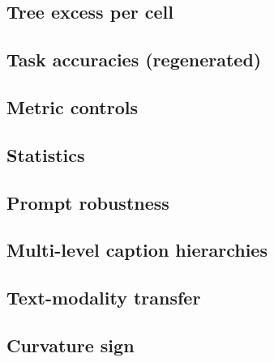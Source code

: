 \documentclass{article} %
\begin{document}
\subsection{Tree excess per cell}

\subsection{Task accuracies (regenerated)}


\subsection{Metric controls}


\subsection{Statistics}

\subsection{Prompt robustness}

\subsection{Multi-level caption hierarchies}

\subsection{Text-modality transfer}

\subsection{Curvature sign}

\end{document}
